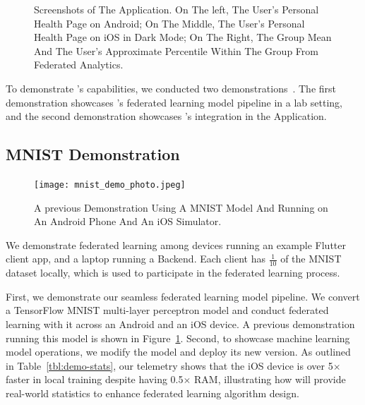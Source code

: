 \begin{figure}
\begin{center}
        \caption{Screenshots of The \fedcampus Application.
            On The left, The User's Personal Health Page on Android;
            On The Middle, The User's Personal Health Page on iOS in Dark Mode;
            On The Right,
            The Group Mean And The User's Approximate Percentile Within The
            Group From Federated Analytics.
        }
    \end{center}\end{figure}

To demonstrate \fedkit's capabilities,
we conducted two demonstrations~\cite{he2024fedkit}.
The first demonstration showcases \fedkit's federated learning model pipeline in
a lab setting,
and the second demonstration showcases \fedkit's integration in the \fedcampus
Application.

\subsection{\fedkit MNIST Demonstration}

\begin{figure}\begin{center}
        \label{fig:lab}
        \texttt{[image: mnist\_demo\_photo.jpeg]}
        \caption{A previous \fedkit Demonstration Using A MNIST Model And
            Running on An Android Phone And An iOS Simulator.
        }
    \end{center}\end{figure}

We demonstrate federated learning among
devices running an example Flutter client app,
and a laptop running a \fedkit Backend. Each client has $\frac{1}{10}$ of the
MNIST~\cite{deng2012mnist} dataset locally,
which is used to participate in the federated learning process.

First, we demonstrate our seamless federated learning model pipeline.
We convert a TensorFlow MNIST multi-layer perceptron model and
conduct federated learning with it across an Android and an iOS device.
A previous demonstration running this model is shown in Figure~\ref{fig:lab}.
Second, to showcase machine learning model operations,
we modify the model and deploy its new version.
As outlined in Table~\ref{tbl:demo-stats},
our telemetry shows that
the iOS device is over 5$\times$ faster in local training despite
having 0.5$\times$ RAM,
illustrating how \fedkit will provide real-world statistics to
enhance federated learning algorithm design.

